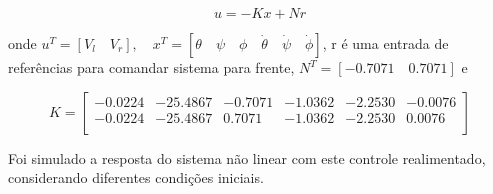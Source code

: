 \documentclass[10pt]{article}
\begin{document}
\begin{equation}
    u = -Kx + Nr
\end{equation}

onde $u^T = [V_l \quad V_r], \quad x^T = [\theta \quad \psi \quad \phi \quad \dot{\theta} \quad \dot{\psi} \quad \dot{\phi}]$,
r é uma entrada de referências para comandar sistema para frente, $N^T = [-0.7071 \quad 0.7071]$ e

\begin{equation}
    K = \begin{bmatrix}
    -0.0224 & -25.4867 & -0.7071 & -1.0362 & -2.2530 & -0.0076 \\
    -0.0224 & -25.4867 & 0.7071 & -1.0362 & -2.2530 & 0.0076 \\
\end{bmatrix}
\end{equation}

\quad Foi simulado a resposta do sistema não linear com este controle realimentado,
considerando diferentes condições iniciais.

\newpage
\end{document}
